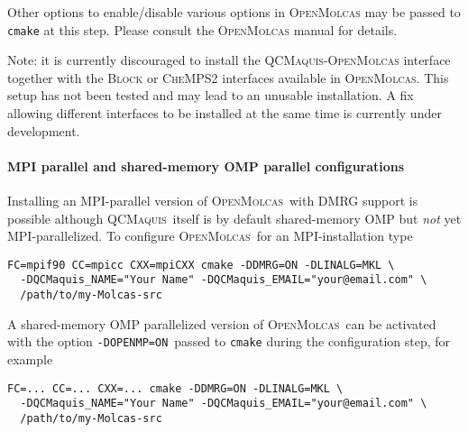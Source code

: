 \documentclass[bibliography=totoc,12pt,a4paper]{scrartcl}
\newcommand{\mol}{\textsc{OpenMolcas}}
\newcommand{\qcm}{\textsc{QCMaquis}}
\begin{document}
Other options to enable/disable various options in \mol{} may be passed to \texttt{cmake} at this step. Please consult the \mol{} manual for details.
\begin{framed}
 \noindent Note: it is currently discouraged to install the \qcm{}-\mol{} interface together with the \textsc{Block} or \textsc{CheMPS2} interfaces available in \mol{}. This setup has not been tested and may lead to an unusable installation. A fix allowing different interfaces to be installed at the same time is currently under development.
\end{framed}



\paragraph{MPI parallel and shared-memory OMP parallel configurations}\label{sec:parallel}$\;$\\

\noindent Installing an MPI-parallel version of \mol\ with DMRG support is possible although
\qcm\ itself is by default shared-memory OMP but \emph{not} yet MPI-parallelized.
To configure \mol\ for an MPI-installation type
\begin{verbatim}
FC=mpif90 CC=mpicc CXX=mpiCXX cmake -DDMRG=ON -DLINALG=MKL \
  -DQCMaquis_NAME="Your Name" -DQCMaquis_EMAIL="your@email.com" \
  /path/to/my-Molcas-src
\end{verbatim}

\vspace{2ex}

A shared-memory OMP parallelized version of \mol\ can be activated with the option
\texttt{-DOPENMP=ON}\ passed to \texttt{cmake} during the configuration step, for example
\begin{verbatim}
FC=... CC=... CXX=... cmake -DDMRG=ON -DLINALG=MKL \
  -DQCMaquis_NAME="Your Name" -DQCMaquis_EMAIL="your@email.com" \
  /path/to/my-Molcas-src
\end{verbatim}
\end{document}

